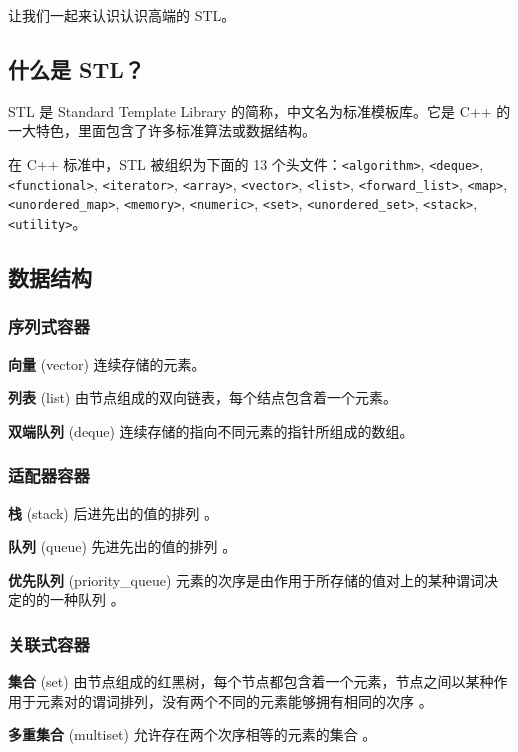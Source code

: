 
让我们一起来认识认识高端的 STL。

\subsection{什么是 STL？}

STL 是 Standard Template Library 的简称，中文名为标准模板库。它是 C++ 的一大特色，里面包含了许多标准算法或数据结构。

在 C++ 标准中，STL 被组织为下面的 13 个头文件：\texttt{<algorithm>}, \texttt{<deque>}, \texttt{<functional>}, \texttt{<iterator>}, \texttt{<array>}, \texttt{<vector>}, \texttt{<list>}, \texttt{<forward_list>}, \texttt{<map>}, \texttt{<unordered_map>}, \texttt{<memory>}, \texttt{<numeric>}, \texttt{<set>}, \texttt{<unordered_set>}, \texttt{<stack>}, \texttt{<utility>}。

\subsection{数据结构}

\subsubsection{序列式容器}

\textbf{向量} (vector) 连续存储的元素。

\textbf{列表} (list) 由节点组成的双向链表，每个结点包含着一个元素。

\textbf{双端队列} (deque) 连续存储的指向不同元素的指针所组成的数组。

\subsubsection{适配器容器}

\textbf{栈} (stack) 后进先出的值的排列 。

\textbf{队列} (queue) 先进先出的值的排列 。

\textbf{优先队列} (priority\_queue) 元素的次序是由作用于所存储的值对上的某种谓词决定的的一种队列 。

\subsubsection{关联式容器}

\textbf{集合} (set) 由节点组成的红黑树，每个节点都包含着一个元素，节点之间以某种作用于元素对的谓词排列，没有两个不同的元素能够拥有相同的次序 。

\textbf{多重集合} (multiset) 允许存在两个次序相等的元素的集合 。

